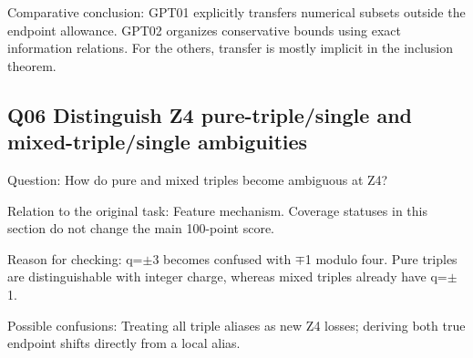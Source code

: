 \documentclass[11pt,a4paper]{article}
\begin{document}
Comparative conclusion: GPT01 explicitly transfers numerical subsets outside the endpoint allowance. GPT02 organizes conservative bounds using exact information relations. For the others,\allowbreak{} transfer is mostly implicit in the inclusion theorem.

\clearpage
\subsection{Q06 Distinguish Z4 pure-triple/\allowbreak{}single and mixed-triple/\allowbreak{}single ambiguities}
\label{aspect:Q06}
Question: How do pure and mixed triples become ambiguous at Z4?

Relation to the original task: Feature mechanism. Coverage statuses in this section do not change the main 100-point score.

Reason for checking: q=\ensuremath{\pm}3 becomes confused with \ensuremath{\mp}1 modulo four. Pure triples are distinguishable with integer charge,\allowbreak{} whereas mixed triples already have q=\ensuremath{\pm}1.

Possible confusions: Treating all triple aliases as new Z4 losses; deriving both true endpoint shifts directly from a local alias.
\end{document}
